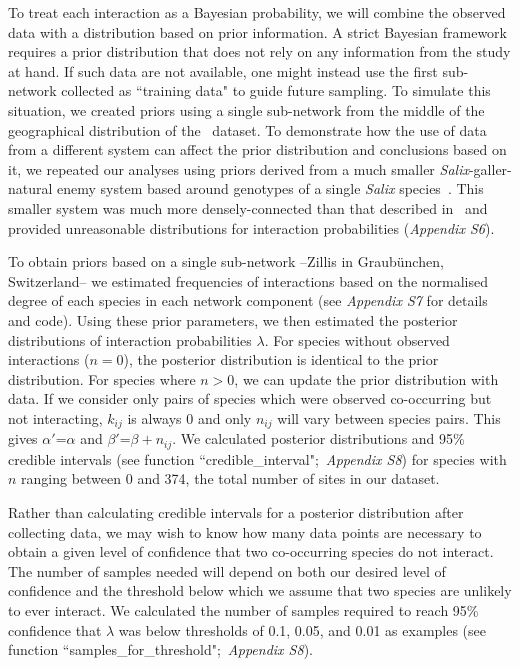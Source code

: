 \documentclass[12pt]{article}
\begin{document}
\begin{spacing}{2.0}
        To treat each interaction as a Bayesian probability, we will combine the observed data with a distribution based on prior information. A strict Bayesian framework requires a prior distribution that does not rely on any information from the study at hand. If such data are not available, one might instead use the first sub-network collected as ``training data" to guide future sampling. To simulate this situation, we created priors using a single sub-network from the middle of the geographical distribution of the~\citet{Kopelke2017} dataset. To demonstrate how the use of data from a different system can affect the prior distribution and conclusions based on it, we repeated our analyses using priors derived from a much smaller \emph{Salix}-galler-natural enemy system based around genotypes of a single \emph{Salix} species~\citep[Data available from the Dryad Digital Repository: https://doi.org/10.5061/dryad.g7805]{Barbour2016}\nocite{Barbour2016Dryad}. This smaller system was much more densely-connected than that described in~\citet{Kopelke2017} and provided unreasonable distributions for interaction probabilities (\emph{Appendix S6}). 


        To obtain priors based on a single sub-network --Zillis in Graub\"{u}nchen, Switzerland-- we estimated frequencies of interactions based on the normalised degree of each species in each network component (see \emph{Appendix S7} for details and code). Using these prior parameters, we then estimated the posterior distributions of interaction probabilities $\lambda$. For species without observed interactions ($n = 0$), the posterior distribution is identical to the prior distribution. For species where $n>0$, we can update the prior distribution with data. If we consider only pairs of species which were observed co-occurring but not interacting, $k_{ij}$ is always 0 and only $n_{ij}$ will vary between species pairs. This gives $\alpha'$=$\alpha$ and $\beta'$=$\beta + n_{ij}$. We calculated posterior distributions and 95\% credible intervals (see function ``credible\_interval";~\emph{Appendix S8}) for species with $n$ ranging between 0 and 374, the total number of sites in our dataset. 


        Rather than calculating credible intervals for a posterior distribution after collecting data, we may wish to know how many data points are necessary to obtain a given level of confidence that two co-occurring species do not interact. The number of samples needed will depend on both our desired level of confidence and the threshold below which we assume that two species are unlikely to ever interact. We calculated the number of samples required to reach 95\% confidence that $\lambda$ was below thresholds of 0.1, 0.05, and 0.01 as examples (see function ``samples\_for\_threshold";~\emph{Appendix S8}).



\end{spacing}
\end{document}

